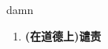 
\begin{frame}
{\huge damn}
\begin{center}
\begin{enumerate}\Large
  \item \textbf{(在道德上)谴责}
\end{enumerate}
\end{center}
\end{frame}

